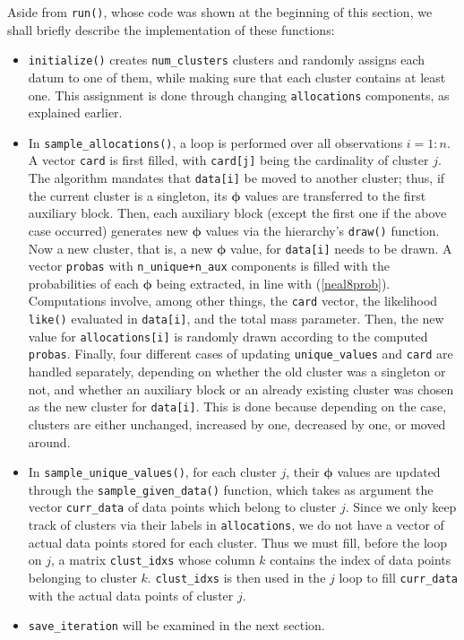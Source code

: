 Aside from \verb|run()|, whose code was shown at the beginning of this section, we shall briefly describe the implementation of these functions:
\begin{itemize}
	\item \verb|initialize()| creates \verb|num_clusters| clusters and randomly assigns each datum to one of them, while making sure that each cluster contains at least one.
	This assignment is done through changing \verb|allocations| components, as explained earlier.
	\item In \verb|sample_allocations()|, a loop is performed over all observations $i=1:n$.
	A vector \verb|card| is first filled, with \verb|card[j]| being the cardinality of cluster $j$.
	The algorithm mandates that \verb|data[i]| be moved to another cluster; thus, if the current cluster is a singleton, its $\boldsymbol\phi$ values are transferred to the first auxiliary block.
	Then, each auxiliary block (except the first one if the above case occurred) generates new $\boldsymbol\phi$ values via the hierarchy's \verb|draw()| function.
	Now a new cluster, that is, a new $\boldsymbol\phi$ value, for \verb|data[i]| needs to be drawn.
	A vector \verb|probas| with \verb|n_unique+n_aux| components is filled with the probabilities of each $\boldsymbol\phi$ being extracted, in line with (\ref{neal8prob}).
	Computations involve, among other things, the \verb|card| vector, the likelihood \verb|like()| evaluated in \verb|data[i]|, and the total mass parameter.
	Then, the new value for \verb|allocations[i]| is randomly drawn according to the computed \verb|probas|.
	Finally, four different cases of updating \verb|unique_values| and \verb|card| are handled separately, depending on whether the old cluster was a singleton or not, and whether an auxiliary block or an already existing cluster was chosen as the new cluster for \verb|data[i]|.
	This is done because depending on the case, clusters are either unchanged, increased by one, decreased by one, or moved around.
	\item In \verb|sample_unique_values()|, for each cluster $j$, their $\boldsymbol\phi$ values are updated through the \verb|sample_given_data()| function, which takes as argument the vector \verb|curr_data| of data points which belong to cluster $j$.
	Since we only keep track of clusters via their labels in \verb|allocations|, we do not have a vector of actual data points stored for each cluster.
	Thus we must fill, before the loop on $j$, a matrix \verb|clust_idxs| whose column $k$ contains the index of data points belonging to cluster $k$.
	\verb|clust_idxs| is then used in the $j$ loop to fill \verb|curr_data| with the actual data points of cluster $j$.
	\item \verb|save_iteration| will be examined in the next section.
\end{itemize}

